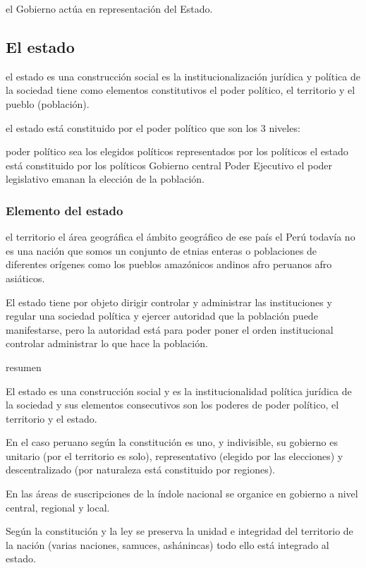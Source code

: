 \documentclass[
  letterpaper,
  DIV=11,
  numbers=noendperiod]{scrartcl}
\begin{document}
el Gobierno actúa en representación del Estado.

\hypertarget{el-estado}{%
\subsection{El estado}\label{el-estado}}

el estado es una construcción social es la institucionalización jurídica
y política de la sociedad tiene como elementos constitutivos el poder
político, el territorio y el pueblo (población).

el estado está constituido por el poder político que son los 3 niveles:

poder político sea los elegidos políticos representados por los
políticos el estado está constituido por los políticos Gobierno central
Poder Ejecutivo el poder legislativo emanan la elección de la población.

\hypertarget{elemento-del-estado}{%
\subsubsection{Elemento del estado}\label{elemento-del-estado}}

el territorio el área geográfica el ámbito geográfico de ese país el
Perú todavía no es una nación que somos un conjunto de etnias enteras o
poblaciones de diferentes orígenes como los pueblos amazónicos andinos
afro peruanos afro asiáticos.

El estado tiene por objeto dirigir controlar y administrar las
instituciones y regular una sociedad política y ejercer autoridad que la
población puede manifestarse, pero la autoridad está para poder poner el
orden institucional controlar administrar lo que hace la población.

resumen

El estado es una construcción social y es la institucionalidad política
jurídica de la sociedad y sus elementos consecutivos son los poderes de
poder político, el territorio y el estado.

En el caso peruano según la constitución es uno, y indivisible, su
gobierno es unitario (por el territorio es solo), representativo
(elegido por las elecciones) y descentralizado (por naturaleza está
constituido por regiones).

En las áreas de suscripciones de la índole nacional se organice en
gobierno a nivel central, regional y local.

Según la constitución y la ley se preserva la unidad e integridad del
territorio de la nación (varias naciones, samuces, ashánincas) todo ello
está integrado al estado.
\end{document}
